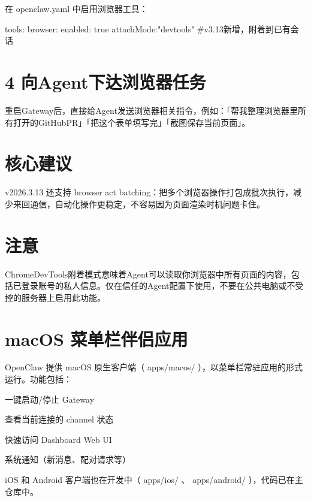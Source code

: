 \documentclass[
  10
]{article}
\newenvironment{Shaded}{}{}
\newcommand{\NormalTok}[1]{#1}
\begin{document}
在 openclaw.yaml 中启用浏览器工具：

\begin{Shaded}
\begin{Highlighting}[]
\NormalTok{tools: browser: enabled: true attachMode:"devtools" \#v3.13新增，附着到已有会话}
\end{Highlighting}
\end{Shaded}

\section{4
向Agent下达浏览器任务}\label{ux5411agentux4e0bux8fbeux6d4fux89c8ux5668ux4efbux52a1}

重启Gateway后，直接给Agent发送浏览器相关指令，例如：「帮我整理浏览器里所有打开的GitHubPR」「把这个表单填写完」「截图保存当前页面」。

\section{核心建议}\label{ux6838ux5fc3ux5efaux8bae-12}

v2026.3.13 还支持 browser act
batching：把多个浏览器操作打包成批次执行，减少来回通信，自动化操作更稳定，不容易因为页面渲染时机问题卡住。

\section{注意}\label{ux6ce8ux610f-10}

ChromeDevTools附着模式意味着Agent可以读取你浏览器中所有页面的内容，包括已登录账号的私人信息。仅在信任的Agent配置下使用，不要在公共电脑或不受控的服务器上启用此功能。

\section{macOS
菜单栏伴侣应用}\label{macos-ux83dcux5355ux680fux4f34ux4fa3ux5e94ux7528}

OpenClaw 提供 macOS 原生客户端（ apps/macos/
），以菜单栏常驻应用的形式运行。功能包括：

一键启动/停止 Gateway

查看当前连接的 channel 状态

快速访问 Dashboard Web UI

系统通知（新消息、配对请求等）

iOS 和 Android 客户端也在开发中（ apps/ios/ 、 apps/android/
），代码已在主仓库中。
\end{document}

